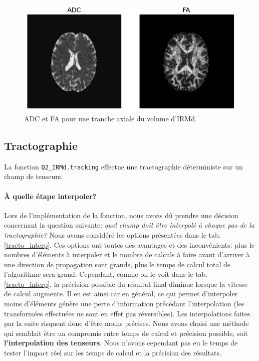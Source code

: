 \documentclass[a4paper]{article}
\begin{document}
\begin{figure}
\begin{center}
\includegraphics[scale=0.9]{adc_fa}
\caption{ADC et FA pour une tranche axiale du volume d'IRMd.\label{adc_fa}}
\end{center}
\end{figure}

\subsection{Tractographie}
La fonction \lstinline{Q2_IRMd.tracking} effectue une tractographie déterministe sur un champ de tenseurs. 

\paragraph{À quelle étape interpoler?} Lors de l'implémentation de la fonction, nous avons dû prendre une décision concernant la question suivante: \textit{quel champ doit être interpolé à chaque pas de la tractographie?} Nous avons considéré les options présentées dans le tab. \ref{tracto_interp}. Ces options ont toutes des avantages et des inconvénients: plus le nombres d'éléments à interpoler et le nombre de calculs à faire avant d'arriver à une direction de propagation sont grands, plus le temps de calcul total de l'algorithme sera grand. Cependant, comme on le voit dans le tab. \ref{tracto_interp}, la précision possible du résultat final diminue lorsque la vitesse de calcul augmente. Il en est ainsi car en général, ce qui permet d'interpoler moins d'éléments génère une perte d'information précédant l'interpolation (les transformées effectuées ne sont en effet pas réversibles). Les interpolations faites par la suite risquent donc d'être moins précises. Nous avons choisi une méthode qui semblait être un compromis entre temps de calcul et précision possible, soit \textbf{l'interpolation des tenseurs}. Nous n'avons cependant pas eu le temps de tester l'impact réel sur les temps de calcul et la précision des résultats.
\end{document}
